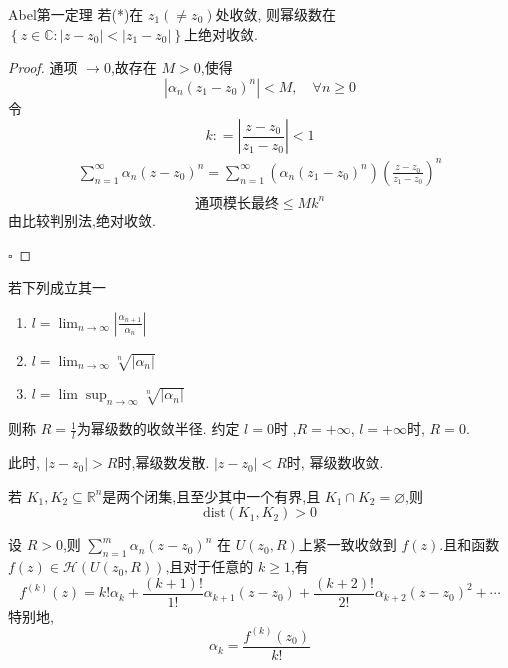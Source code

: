 \documentclass[../../复变函数.tex]{subfiles}
\begin{document}
\begin{theorem}{Abel第一定理}
    若(*)在 \(  z_1\left( \neq z_0 \right)   \)处收敛,  则幂级数在 \(  \left\{ z \in \mathbb{C} :\left| z-z_0 \right|< \left| z_1-z_0 \right|   \right\}  \)上绝对收敛.
\end{theorem}
\begin{proof}
    通项 \(  \to 0  \),故存在 \(  M> 0  \),使得 \[
    \left| \alpha _{n}\left( z_1-z_0 \right)^{n}  \right|< M,\quad \forall n\ge 0 
    \]   令\[
    k: =  \left| \frac{z-z_0 }{z_1-z_0 }  \right|< 1 
    \] \[
    \begin{aligned}
    \sum _{n = 1}^{\infty}\alpha _{n}\left( z-z_0 \right)^{n}=  \sum _{n =  1}^{\infty} \left( \alpha _{n}\left( z_1-z_0 \right)^{n}  \right)\left( \frac{z-z_0 }{z_1-z_0 }  \right)^{n}    \\ 
    \end{aligned}
    \] \[
    \text{通项模长最终} \le Mk^{n}
    \]由比较判别法,绝对收敛.

    \hfill $\square$
\end{proof}

\begin{theorem}
    若下列成立其一 
    \begin{enumerate}
        \item \(  l =  \lim_{n\to \infty}\left| \frac{\alpha _{n+ 1} }{ \alpha _{n} }  \right|   \)
        \item \(  l =  \lim_{n\to \infty} \sqrt[n]{\left| \alpha _{n} \right| } \)  
        \item \(  l = \lim   \sup _{n\to \infty} \sqrt[n]{\left| \alpha _{n} \right| }\) 
    \end{enumerate}
    则称 \(  R =  \frac{1 }{l }   \)为幂级数的收敛半径. 约定 \(  l = 0  \)时 ,\(  R =  + \infty  \), \(   l =  +  \infty  \)时, \(  R = 0  \).   
    
    此时, \(  \left| z-z_0 \right|> R   \)时,幂级数发散. \(  \left| z-z_0 \right|< R   \)时, 幂级数收敛.  
\end{theorem}

\begin{lemma}
    若 \(  K_1,K_2\subseteq \mathbb{R} ^{n}  \)是两个闭集,且至少其中一个有界,且 \(  K_1\cap K_2= \varnothing  \),则\[
    \mathrm{dist}\left( K_1,K_2 \right)>0 
    \]  
\end{lemma}

\begin{theorem}
    设 \(  R> 0  \),则 \(  \sum _{n = 1}^{m} \alpha _{n}\left( z-z_0 \right)^{n}   \)  在 \(  U\left( z_0,R \right)   \)上紧一致收敛到 \(  f\left( z \right)   \).且和函数 \(  f\left( z \right) \in \mathcal{H}\left( U\left( z_0,R \right)  \right)    \),且对于任意的 \(  k\ge 1  \),有 \[
        f^{\left( k \right) }\left( z \right)=  k!\alpha _{k}+  \frac{\left( k+ 1 \right)!  }{1! }\alpha _{k+ 1}\left( z-z_0 \right)+ \frac{\left( k+ 2 \right)!  }{2! }\alpha _{k+ 2}\left( z-z_0 \right)^{2}+ \cdots        
    \] 特别地, \[
        \alpha _{k}= \frac{f^{\left( k \right)  } \left( z_0 \right)}{k! } 
    \]
\end{theorem}
\end{document}
